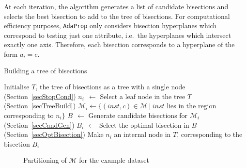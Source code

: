 \documentclass[a4paper,12pt]{article} %
\newcommand{\AdaProp}{\texttt{AdaProp}\xspace}
\newcommand{\mcl}[1]{\mathcal{#1}}
\begin{document}
At each iteration,
    the algorithm generates a list of candidate bisections and
    selects the best bisection to add to the tree of bisections.
For computational efficiency purposes,
    \AdaProp only considers bisection hyperplanes which
    correspond to testing just one attribute, 
    i.e.\ the hyperplanes which intersect exactly one axis.
Therefore, each bisection corresponds to a hyperplane of the form $a_i = c$.

\begin{algorithm}
\caption{Building a tree of bisections}
\label{algoTree} 
\begin{algorithmic}
\State Initialise $T$, the tree of bisections as a tree with a single node
 \hfill (Section~\ref{secStopCond})
    \State $n_i ~~\gets$ Select a leaf node in the tree $T$ \hfill (Section~\ref{secTreeBuild})
    \State $\mcl{M}_i \gets \{ (inst,c) \in \mcl{M} ~|~ inst$ 
        lies in the region corresponding to $n_i \}$
    \State $B ~~\gets$ Generate candidate bisections for $\mcl{M}_i$ \hfill (Section~\ref{secCandGen})
    \State $B_i \,~\gets$ Select the optimal bisection in $B$ \hfill (Section~\ref{secOptBisection})
    \State Make $n_i$ an internal node in $T$, corresponding 
        to the bisection $B_i$
\EndWhile
\end{algorithmic}
\end{algorithm}

\begin{figure}
\begin{center}
\end{center}
\caption{Partitioning of $\mcl{M}$ for the example dataset}
\label{visMpart}
\end{figure}
\end{document}
